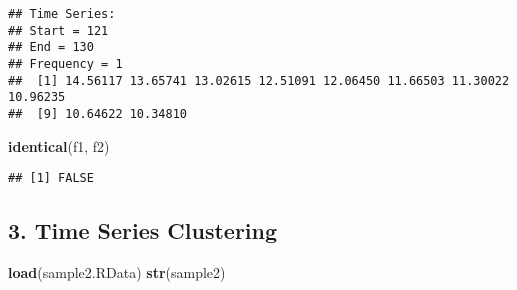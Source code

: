 \documentclass[
]{article}
\newenvironment{Shaded}{\begin{snugshade}}{\end{snugshade}}
\newcommand{\FunctionTok}[1]{\textcolor[rgb]{0.13,0.29,0.53}{\textbf{#1}}}
\newcommand{\NormalTok}[1]{#1}
\newcommand{\StringTok}[1]{\textcolor[rgb]{0.31,0.60,0.02}{#1}}
\begin{document}
\begin{verbatim}
## Time Series:
## Start = 121 
## End = 130 
## Frequency = 1 
##  [1] 14.56117 13.65741 13.02615 12.51091 12.06450 11.66503 11.30022 10.96235
##  [9] 10.64622 10.34810
\end{verbatim}

\begin{Shaded}
\begin{Highlighting}[]
\FunctionTok{identical}\NormalTok{(f1, f2)}
\end{Highlighting}
\end{Shaded}

\begin{verbatim}
## [1] FALSE
\end{verbatim}

\subsection{3. Time Series Clustering}\label{time-series-clustering}

\begin{Shaded}
\begin{Highlighting}[]
\FunctionTok{load}\NormalTok{(}\StringTok{\textquotesingle{}sample2.RData\textquotesingle{}}\NormalTok{)}
\FunctionTok{str}\NormalTok{(sample2)}
\end{Highlighting}
\end{Shaded}
\end{document}
